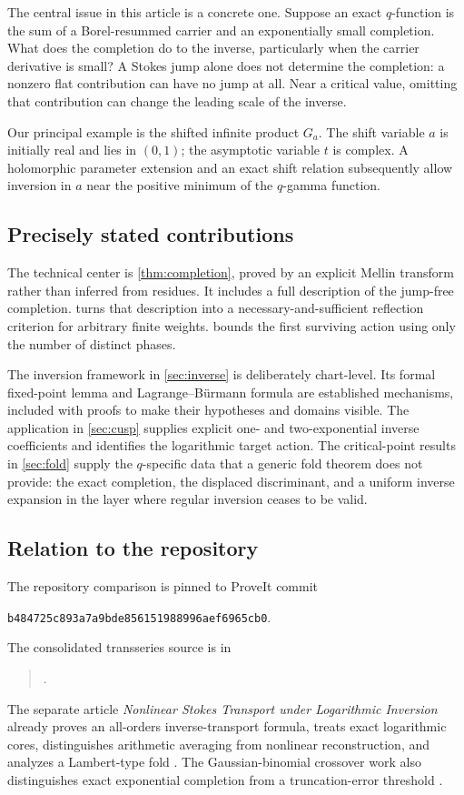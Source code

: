 \documentclass[11pt,a4paper]{article}
\numberwithin{equation}{section}
\theoremstyle{definition}
\theoremstyle{remark}
\begin{document}
The central issue in this article is a concrete one. Suppose an exact $q$-function is the sum of a Borel-resummed carrier and an exponentially small completion. What does the completion do to the inverse, particularly when the carrier derivative is small? A Stokes jump alone does not determine the completion: a nonzero flat contribution can have no jump at all. Near a critical value, omitting that contribution can change the leading scale of the inverse.

Our principal example is the shifted infinite product $G_a$. The shift variable $a$ is initially real and lies in $(0,1)$; the asymptotic variable $t$ is complex. A holomorphic parameter extension and an exact shift relation subsequently allow inversion in $a$ near the positive minimum of the $q$-gamma function.

\subsection{Precisely stated contributions}
The technical center is \cref{thm:completion}, proved by an explicit Mellin transform rather than inferred from residues. It includes a full description of the jump-free completion.  turns that description into a necessary-and-sufficient reflection criterion for arbitrary finite weights.  bounds the first surviving action using only the number of distinct phases.

The inversion framework in \cref{sec:inverse} is deliberately chart-level. Its formal fixed-point lemma and Lagrange--B\"urmann formula are established mechanisms, included with proofs to make their hypotheses and domains visible. The application in \cref{sec:cusp} supplies explicit one- and two-exponential inverse coefficients and identifies the logarithmic target action. The critical-point results in \cref{sec:fold} supply the $q$-specific data that a generic fold theorem does not provide: the exact completion, the displaced discriminant, and a uniform inverse expansion in the layer where regular inversion ceases to be valid.

\subsection{Relation to the repository}
The repository comparison is pinned to ProveIt commit
\begin{center}
\texttt{b484725c893a7a9bde856151988996aef6965cb0}.
\end{center}
The consolidated transseries source is in
\begin{quote}\small
{}.
\end{quote}
The separate article \emph{Nonlinear Stokes Transport under Logarithmic Inversion} already proves an all-orders inverse-transport formula, treats exact logarithmic cores, distinguishes arithmetic averaging from nonlinear reconstruction, and analyzes a Lambert-type fold \cite{repo,repotransport}. The Gaussian-binomial crossover work also distinguishes exact exponential completion from a truncation-error threshold \cite{repocrossover}.
\end{document}
